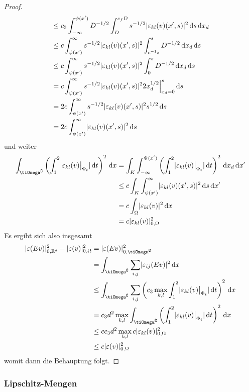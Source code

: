 \documentclass{scrartcl}
\def\R{\mathbb{R}}
\def\e{\varepsilon}
\newcommand{\dif}[1]{\,\mathrm{d} #1}
\DeclarePairedDelimiter{\abs}{|}{|}
\begin{document}
\begin{proof}
\begin{align*}
		&\leq c_3\int_{-\infty}^{\psi(x')}D^{-1/2}\int_{D}^{c_fD}s^{-1/2}\abs{\e_{kl}(v)(x',s)}^2\dif s\dif x_d \\
		&\leq c\int_{\psi(x')}^{\infty}s^{-1/2}\abs{\e_{kl}(v)(x',s)}^2\int_{c^{-1}s}^sD^{-1/2}\dif x_d\dif s \\
		&\leq c\int_{\psi(x')}^{\infty}s^{-1/2}\abs{\e_{kl}(v)(x',s)}^2\int_{0}^sD^{-1/2}\dif x_d\dif s \\
		&= c\int_{\psi(x')}^{\infty}s^{-1/2}\abs{\e_{kl}(v)(x',s)}^22x_d^{1/2}\Big\vert_{x_d=0}^s\dif s \\
		&= 2c\int_{\psi(x')}^{\infty}s^{-1/2}\abs{\e_{kl}(v)(x',s)}^2s^{1/2}\dif s \\
		&= 2c\int_{\psi(x')}^{\infty}\abs{\e_{kl}(v)(x',s)}^2\dif s
	\end{align*}
	und weiter
	\begin{align*}
		\int_{\tiOmega^\complement}\left(\int_1^2\abs{\e_{kl}(v)\big\vert_{\Phi_t}}\dif t\right)^2\dif x
		&= \int_{K}\int_{-\infty}^{\Psi(x')}\left(\int_1^2\abs{\e_{kl}(v)\big\vert_{\Phi_t}}\dif t\right)^2\dif x_d\dif x' \\
		&\leq c\int_{K}\int_{\psi(x')}^{\infty}\abs{\e_{kl}(v)(x',s)}^2\dif s\dif x' \\
		&= c\int_{\Omega}\abs{\e_{kl}(v)}^2\dif x \\
		&= c\abs{\e_{kl}(v)}_{0,\Omega}^2
	\end{align*}
	Es ergibt sich also insgesamt
	\begin{align*}
		\abs{\e(Ev)}_{0,\R^d}^2-\abs{\e(v)}_{0,\Omega}^2
		&= \abs{\e(Ev)}_{0,\tiOmega^\complement}^2 \\
		&= \int_{\tiOmega^\complement}\sum_{i,j}\abs{\e_{ij}(Ev)}^2\dif x \\
		&\leq  \int_{\tiOmega^\complement}\sum_{i,j}\left(c_3\max_{k,l}\int_1^2\abs{\e_{kl}(v)\big\vert_{\Phi_t}}\dif t\right)^2\dif x \\
		&=  c_3d^2\max_{k,l}\int_{\tiOmega^\complement}\left(\int_1^2\abs{\e_{kl}(v)\big\vert_{\Phi_t}}\dif t\right)^2\dif x \\
		&\leq  cc_3d^2\max_{k,l}c\abs{\e_{kl}(v)}_{0,\Omega}^2 \\
		&\leq  c\abs{\e(v)}_{0,\Omega}^2 \\
	\end{align*}
	womit dann die Behauptung folgt.
\end{proof}

\subsubsection*{Lipschitz-Mengen}
\end{document}
